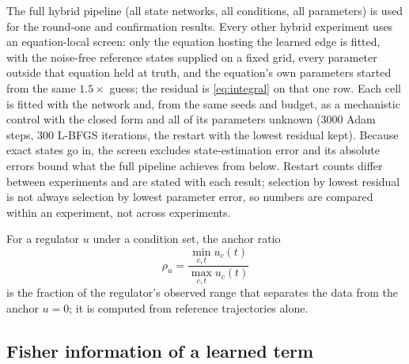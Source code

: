 The full hybrid pipeline (all state networks, all conditions, all
parameters) is used for the round-one and confirmation results. Every other
hybrid experiment uses an equation-local screen: only the equation hosting the
learned edge is fitted, with the noise-free reference states supplied on a fixed
grid, every parameter outside that equation held at truth, and the equation's
own parameters started from the same $1.5\times$ guess; the residual is
\eqref{eq:integral} on that one row. Each cell is fitted with the network and,
from the same seeds and budget, as a mechanistic control with the closed form
and all of its parameters unknown (3000 Adam steps, 300 L-BFGS iterations, the
restart with the lowest residual kept). Because exact states go in, the screen
excludes state-estimation error and its absolute errors bound what the full
pipeline achieves from below. Restart counts differ between experiments and are
stated with each result; selection by lowest residual is not always selection by
lowest parameter error, so numbers are compared within an experiment, not
across experiments.

For a regulator $u$ under a condition set, the anchor ratio
\begin{equation}
\rho_u = \frac{\min_{c,t}u_c(t)}{\max_{c,t}u_c(t)}
\label{eq:ratio}
\end{equation}
is the fraction of the regulator's observed range that separates the data from
the anchor $u=0$; it is computed from reference trajectories alone.

\subsection{Fisher information of a learned term}
\label{sec:m-hfim}

